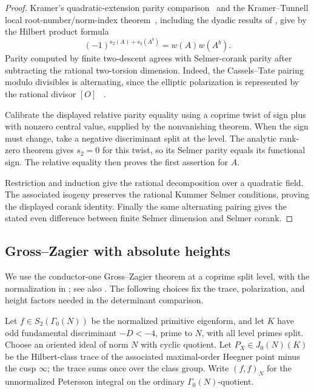 \begin{proof}
Kramer's quadratic-extension parity comparison~\cite{Kramer81}
and the Kramer--Tunnell local root-number/norm-index
theorem~\cite{KramerTunnell82}, including the dyadic results
of \cite{DD10,DD11,CI16}, give by the Hilbert product formula
\[
 (-1)^{s_2(A)+s_2(A^b)}=w(A)w(A^b).
\]
Parity computed by finite two-descent agrees with Selmer-corank parity
after subtracting the rational two-torsion dimension. Indeed, the
Cassels--Tate pairing modulo divisibles is alternating, since the
elliptic polarization is represented by the rational divisor
\([O]\)~\cite[Remark~I.6.11]{MilneADT}
\cite[Theorem~5 and Corollary~7]{PoonenStoll1999}.

Calibrate the displayed relative parity equality using a coprime twist
of sign plus with nonzero central value, supplied by the nonvanishing
theorem. When the sign must change, take a negative discriminant split
at the level. The analytic rank-zero theorem gives \(s_2=0\) for this
twist, so its Selmer parity equals its functional sign. The relative
equality then proves the first assertion for \(A\).

Restriction and induction give the rational decomposition over a quadratic field. The associated isogeny preserves the rational Kummer Selmer conditions, proving the displayed corank identity. Finally the same alternating pairing gives the stated even difference between finite Selmer dimension and Selmer corank.
\end{proof}

\subsection{Gross--Zagier with absolute heights}

We use the conductor-one Gross--Zagier theorem at a coprime split
level, with the normalization in
\cite[Chapter~I, (4.3) and (6.4); Chapter~V, Theorem~(2.1)]{GZ86};
see also \cite{CST14,Conrad03}. The following choices fix the trace,
polarization, and height factors needed in the determinant comparison.

Let \(f\in S_2(\Gamma_0(N))\) be the normalized primitive eigenform,
and let \(K\) have odd fundamental discriminant \(-D<-4\), prime
to \(N\), with all level primes split. Choose an oriented ideal of
norm \(N\) with cyclic quotient. Let \(P_X\in J_0(N)(K)\) be the
Hilbert-class trace of the associated maximal-order Heegner point
minus the cusp \(\infty\); the trace sums once over the class group.
Write \((f,f)_N\) for the unnormalized Petersson integral on the
ordinary \(\Gamma_0(N)\)-quotient.

